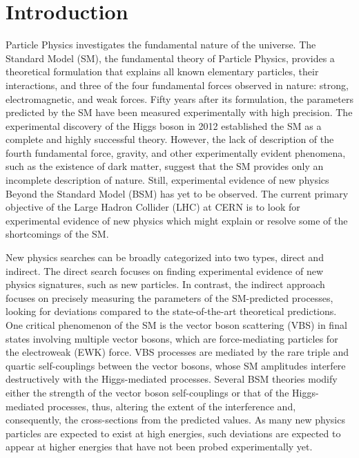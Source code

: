\part{Introduction}
\label{sec:Introduction}
Particle Physics investigates the fundamental nature of the universe. The Standard Model (SM), the fundamental theory of Particle Physics, provides a theoretical formulation that explains all known elementary particles, their interactions, and three of the four fundamental forces observed in nature: strong, electromagnetic, and weak forces. Fifty years after its formulation, the parameters predicted by the SM have been measured experimentally with high precision. The experimental discovery of the Higgs boson in 2012 established the SM as a complete and highly successful theory. However, the lack of description of the fourth fundamental force, gravity, and other experimentally evident phenomena, such as the existence of dark matter, suggest that the SM provides only an incomplete description of nature. Still, experimental evidence of new physics Beyond the Standard Model (BSM) has yet to be observed. The current primary objective of the Large Hadron Collider (LHC) at CERN is to look for experimental evidence of new physics which might explain or resolve some of the shortcomings of the SM. 

New physics searches can be broadly categorized into two types, direct and indirect. The direct search focuses on finding experimental evidence of new physics signatures, such as new particles. In contrast, the indirect approach focuses on precisely measuring the parameters of the SM-predicted processes, looking for deviations compared to the state-of-the-art theoretical predictions. One critical phenomenon of the SM is the vector boson scattering (VBS) in final states involving multiple vector bosons, which are force-mediating particles for the electroweak (EWK) force. VBS processes are mediated by the rare triple and quartic self-couplings between the vector bosons, whose SM amplitudes interfere destructively with the Higgs-mediated processes. Several BSM theories modify either the strength of the vector boson self-couplings or that of the Higgs-mediated processes, thus, altering the extent of the interference and, consequently, the cross-sections from the predicted values. As many new physics particles are expected to exist at high energies, such deviations are expected to appear at higher energies that have not been probed experimentally yet. 

